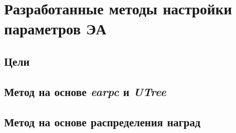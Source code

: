 \chapter{Разработанные методы настройки параметров ЭА}
\label{proposed_chapter}
\section{Цели}

\section{Метод на основе \textit{earpc} и \textit{UTree}}

\section{Метод на основе распределения наград}